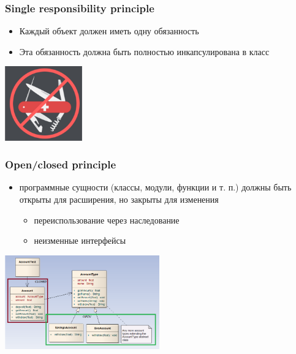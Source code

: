 \documentclass[xetex,mathserif,serif]{beamer}
\begin{document}
    \begin{frame}
        \frametitle{Single responsibility principle}
        \begin{itemize}
            \item Каждый объект должен иметь одну обязанность
            \item Эта обязанность должна быть полностью инкапсулирована в класс
        \end{itemize}
        \begin{flushright}
            \includegraphics[width=0.25\textwidth]{singleResponsibility.png}
        \end{flushright}
    \end{frame}

    \begin{frame}
        \frametitle{Open/closed principle}
        \begin{itemize}
            \item программные сущности (классы, модули, функции и т. п.) должны быть открыты для расширения, но закрыты для изменения
            \begin{itemize}
                \item переиспользование через наследование
                \item неизменные интерфейсы
            \end{itemize}
        \end{itemize}
        \begin{flushright}
            \includegraphics[width=0.5\textwidth]{openClosedPrinciple.png}
        \end{flushright}
    \end{frame}
\end{document}
